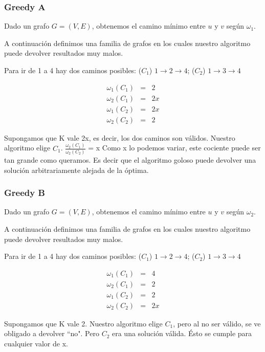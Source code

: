 \subsubsection{Greedy A}\label{subsubsec:greedy-a}
Dado un grafo $G = (V,E)$, obtenemos el camino m\'inimo entre $u$ y $v$ seg\'un $\omega_1$. 

A continuación definimos una familia de grafos en los cuales nuestro algoritmo puede devolver resultados muy malos.

Para ir de 1 a 4 hay dos caminos posibles: ($C_1$) $1 \rightarrow 2 \rightarrow 4$; ($C_2$) $1 \rightarrow 3 \rightarrow 4$

\begin{eqnarray}
 \omega_1(C_1) &=& 2 	\\ 
 \omega_2(C_1) &=& 2x	\\
 \omega_1(C_2) &=& 2x	\\
 \omega_2(C_2) &=& 2
\end{eqnarray}

Supongamos que K vale 2x, es decir, los dos caminos son válidos. Nuestro algoritmo elige $C_1$.
$\frac{\omega_2(C_1)}{\omega_2(C_2)}$ = x
Como x lo podemos variar, este cociente puede ser tan grande como queramos. Es decir que el algoritmo goloso puede devolver una solución
arbitrariamente alejada de la óptima.

\clearpage
\subsubsection{Greedy B}\label{subsubsec:greedy-b}
Dado un grafo $G = (V,E)$, obtenemos el camino m\'inimo entre $u$ y $v$ seg\'un $\omega_2$. 

A continuación definimos una familia de grafos en los cuales nuestro algoritmo puede devolver resultados muy malos.

Para ir de 1 a 4 hay dos caminos posibles: ($C_1$) $1 \rightarrow 2 \rightarrow 4$; ($C_2$) $1 \rightarrow 3 \rightarrow 4$

\begin{eqnarray}
 \omega_1(C_1) &=& 4 	\\ 
 \omega_2(C_1) &=& 2	\\
 \omega_1(C_2) &=& 2	\\
 \omega_2(C_2) &=& 2x
\end{eqnarray}

Supongamos que K vale 2. Nuestro algoritmo elige $C_1$, pero al no ser válido, se ve obligado a devolver ``no". Pero $C_2$ era una solución
válida. Ésto se cumple para cualquier valor de x.

